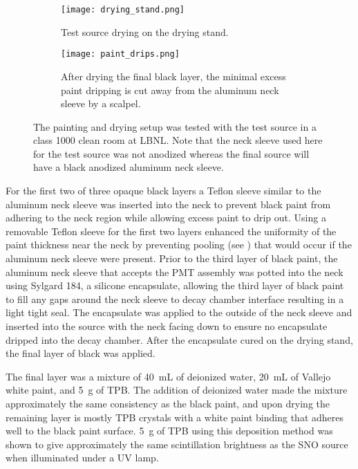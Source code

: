 \begin{figure}
\begin{subfigure}{.28\textwidth}
\texttt{[image: drying\_stand.png]}
\caption{Test source drying on the drying stand.}
\end{subfigure}
\hspace{0.5cm}
\begin{subfigure}{.67\textwidth}
\texttt{[image: paint\_drips.png]}
\caption{After drying the final black layer, the minimal excess paint dripping is cut away from the aluminum neck sleeve by a scalpel.}
\end{subfigure}
\caption{The painting and drying setup was tested with the test source in a class 1000 clean room at LBNL. Note that the neck sleeve used here for the test source was not anodized whereas the final source will have a black anodized aluminum neck sleeve.}
\label{fig:drying}
\end{figure}


For the first two of three opaque black layers a Teflon sleeve similar to the aluminum neck sleeve was inserted into the neck to prevent black paint from adhering to the neck region while allowing excess paint to drip out. Using a removable Teflon sleeve for the first two layers enhanced the uniformity of the paint thickness near the neck by preventing pooling (see ) that would occur if the aluminum neck sleeve were present. Prior to the third layer of black paint, the aluminum neck sleeve that accepts the PMT assembly was potted into the neck using Sylgard 184, a silicone encapsulate, allowing the third layer of black paint to fill any gaps around the neck sleeve to decay chamber interface resulting in a light tight seal. The encapsulate was applied to the outside of the neck sleeve and inserted into the source with the neck facing down to ensure no encapsulate dripped into the decay chamber. After the encapsulate cured on the drying stand, the final layer of black was applied.

The final layer was a mixture of 40~mL of deionized water, 20~mL of Vallejo white paint, and 5~g of TPB. The addition of deionized water made the mixture approximately the same consistency as the black paint, and upon drying the remaining layer is mostly TPB crystals with a white paint binding that adheres well to the black paint surface. 5~g of TPB using this deposition method was shown to give approximately the same scintillation brightness as the SNO \Li source when illuminated under a UV lamp.


